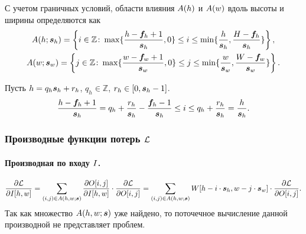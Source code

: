 \documentclass{report}
\numberwithin{theorem}{chapter}
\numberwithin{statement}{chapter}
\numberwithin{lemma}{chapter}
\theoremstyle{definition}
\numberwithin{task}{chapter}
\theoremstyle{remark}
\numberwithin{example}{chapter}
\theoremstyle{definition}
\numberwithin{definition}{chapter}
\theoremstyle{remark}
\theoremstyle{remark}
\numberwithin{lyrics}{section}
\begin{document}
С учетом граничных условий, области влияния $A(h)$ и $A(w)$ вдоль высоты и ширины определяются как
\begin{gather*}
A(h; \boldsymbol{s}_h) = \left\{i \in \mathbb{Z} \colon \max\{\frac{h - \boldsymbol{f}_h + 1}{\boldsymbol{s}_h}, 0\} \le i \le \min\{\frac{h}{\boldsymbol{s}_h}, \frac{H - \boldsymbol{f}_h}{\boldsymbol{s}_h}\}\right\},\\
A(w; \boldsymbol{s}_w) = \left\{j \in \mathbb{Z} \colon \max\{\frac{w - \boldsymbol{f}_w + 1}{\boldsymbol{s}_w}, 0\} \le j \le \min\{\frac{w}{\boldsymbol{s}_w}, \frac{W - \boldsymbol{f}_w}{\boldsymbol{s}_w}\}\right\}.\\
\end{gather*}

Пусть $h = q_h\boldsymbol{s}_h + r_h$, $q_h \in \mathbb{Z}$, $r_h \in [0, \boldsymbol{s}_h - 1]$.
\begin{equation*}
\frac{h - \boldsymbol{f}_h + 1}{\boldsymbol{s}_h} = q_h + \frac{r_h}{\boldsymbol{s}_h} -\frac{\boldsymbol{f}_h - 1}{\boldsymbol{s}_h} \le i \le q_h + \frac{r_h}{\boldsymbol{s}_h} = \frac{h}{\boldsymbol{s}_h}.
\end{equation*}

\subsubsection{Производные функции потерь $\mathcal{L}$}
\paragraph{Производная по входу $I$.}
\begin{equation}
\frac{\partial \mathcal{L} }{\partial I[h, w]}= \sum\limits_{(i, j) \in A(h, w; \boldsymbol{s})} 
\frac{\partial O[i, j] }{\partial I[h, w]} \cdot \frac{\partial \mathcal{L} }{\partial O[i, j]} =
\sum\limits_{(i, j) \in A(h, w; \boldsymbol{s})} W[h - i \cdot \boldsymbol{s}_h, w - j \cdot \boldsymbol{s}_w] \cdot \frac{\partial \mathcal{L} }{\partial O[i, j]}.
\end{equation}
Так как множество $A(h, w; \boldsymbol{s})$ уже найдено, то поточечное вычисление данной производной не представляет проблем.
\end{document}
